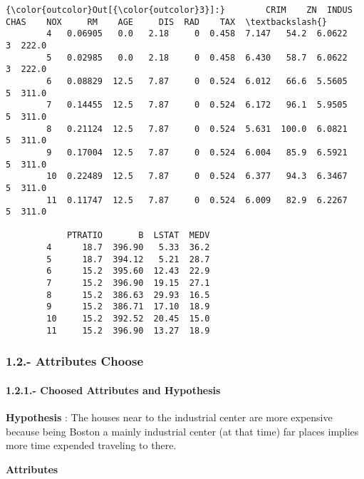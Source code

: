 \documentclass[11pt]{article}
\begin{document}
\begin{Verbatim}[commandchars=\\\{\}]
{\color{outcolor}Out[{\color{outcolor}3}]:}        CRIM    ZN  INDUS  CHAS    NOX     RM    AGE     DIS  RAD    TAX  \textbackslash{}
        4   0.06905   0.0   2.18     0  0.458  7.147   54.2  6.0622    3  222.0   
        5   0.02985   0.0   2.18     0  0.458  6.430   58.7  6.0622    3  222.0   
        6   0.08829  12.5   7.87     0  0.524  6.012   66.6  5.5605    5  311.0   
        7   0.14455  12.5   7.87     0  0.524  6.172   96.1  5.9505    5  311.0   
        8   0.21124  12.5   7.87     0  0.524  5.631  100.0  6.0821    5  311.0   
        9   0.17004  12.5   7.87     0  0.524  6.004   85.9  6.5921    5  311.0   
        10  0.22489  12.5   7.87     0  0.524  6.377   94.3  6.3467    5  311.0   
        11  0.11747  12.5   7.87     0  0.524  6.009   82.9  6.2267    5  311.0   
        
            PTRATIO       B  LSTAT  MEDV  
        4      18.7  396.90   5.33  36.2  
        5      18.7  394.12   5.21  28.7  
        6      15.2  395.60  12.43  22.9  
        7      15.2  396.90  19.15  27.1  
        8      15.2  386.63  29.93  16.5  
        9      15.2  386.71  17.10  18.9  
        10     15.2  392.52  20.45  15.0  
        11     15.2  396.90  13.27  18.9  
\end{Verbatim}
            
    \subsubsection{1.2.- Attributes Choose}\label{attributes-choose}

    \paragraph{1.2.1.- Choosed Attributes and
Hypothesis}\label{choosed-attributes-and-hypothesis}

\textbf{Hypothesis} : The houses near to the industrial center are more
expensive because being Boston a mainly industrial center (at that time)
far places implies more time expended traveling to there.

\textbf{Attributes}
\end{document}
